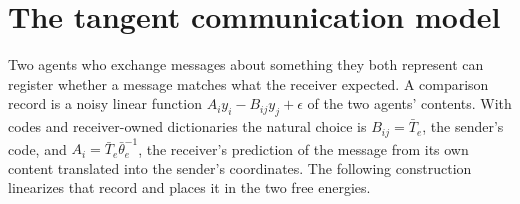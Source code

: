 \section{The tangent communication model}
\label{it2:ch-model}

Two agents who exchange messages about something they both represent can register whether a message matches what the receiver expected. A comparison record is a noisy linear function $A_iy_i-B_{ij}y_j+\epsilon$ of the two agents' contents. With codes and receiver-owned dictionaries the natural choice is $B_{ij}=\bar T_e$, the sender's code, and $A_i=\bar T_e\bar\theta_e^{-1}$, the receiver's prediction of the message from its own content translated into the sender's coordinates. The following construction linearizes that record and places it in the two free energies.

